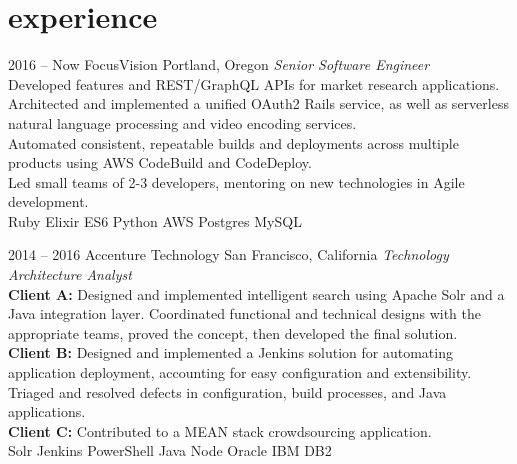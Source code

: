 \documentclass[]{friggeri-cv} %
\begin{document}
\section{experience}

\begin{entrylist}


\entry
{2016 -- Now}
{FocusVision}
{Portland, Oregon}
{\emph{Senior Software Engineer} \\
    Developed features and REST/GraphQL APIs for market research applications.
    \\
    Architected and implemented a unified OAuth2 Rails service, as well as serverless natural language processing and video encoding services.
    \\
    Automated consistent, repeatable builds and deployments across multiple products using AWS CodeBuild and CodeDeploy.
    \\
    Led small teams of 2-3 developers, mentoring on new technologies in Agile development.
    \\
Ruby \mydot Elixir \mydot ES6 \mydot Python \mydot AWS \mydot Postgres \mydot MySQL}

\entry
{2014 -- 2016}
{Accenture Technology}
{San Francisco, California}
{\emph{Technology Architecture Analyst} \\
    \textbf{Client A:} Designed and implemented intelligent search using Apache Solr and a Java integration layer. Coordinated functional and technical designs with the appropriate teams, proved the concept, then developed the final solution.
    \\
    \textbf{Client B:} Designed and implemented a Jenkins solution for automating application deployment, accounting for easy configuration and extensibility. Triaged and resolved defects in configuration, build processes, and Java applications.
    \\
    \textbf{Client C:} Contributed to a MEAN stack crowdsourcing application. \\
Solr \mydot Jenkins \mydot PowerShell \mydot Java \mydot Node \mydot Oracle \mydot IBM DB2}


\end{entrylist}
\end{document}
